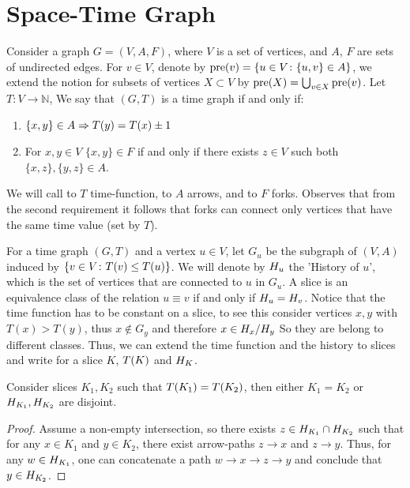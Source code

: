 

  \section{Space-Time Graph}
    


  \begin{definition}
    Consider a graph $G = (V, A, F)$, where $V$ is a set of vertices, and $A$, $F$ are sets of undirected edges. For $v \in V$, denote by $\text{pre}(v) = \{ u \in V \colon \{u,v\} \in A \}$, we extend the notion for subsets of vertices $X \subset V$ by $\text{pre}(X) = \bigcup_{v \in X} \text{pre}(v)$. Let $ T \colon V \rightarrow \mathbb{N}$, We say that $(G,T)$ is a time graph if and only if:
\begin{enumerate}
  \item $\{x,y\} \in A \Rightarrow T(y) = T(x) \pm 1$  
  \item For $x,y \in V $  $\{x,y\} \in F $ if and only if there exists $z \in V $ such both $\{x,z\},\{y,z\} \in A$. 
\end{enumerate} We will call to $T$ time-function, to $A$ arrows, and to $F$ forks. Observes that from the second requirement it follows that forks can connect only vertices that have the same time value (set by $T$). 
  \end{definition}




  \begin{definition}
    For a time graph $(G,T)$ and a vertex $u \in V$, let $G_{u}$ be the subgraph of $(V,A)$ induced by $\{ v \in V \colon T(v) \le T(u) \}$. We will denote by $H_{u}$ the 'History of $u$', which is the set of vertices that are connected to $u$ in $G_{u}$. A slice is an equivalence class of the relation $u \equiv v$ if and only if $H_{u} = H_{v}$. Notice that the time function has to be constant on a slice, to see this consider vertices  $x,y$ with $T(x) > T(y)$, thus $x \notin G_{y}$ and therefore $x \in H_{x}/H_{y}$ So they are belong to different classes. Thus, we can extend the time function and the history to slices and write for a slice $K$, $T(K)$ and $H_{K}$.
  \end{definition}

  \begin{claim} 
    \label{cref:disj}
    Consider slices $K_{1}, K_{2}$ such that $T(K_1) = T(K_2)$, then either $K_{1}=K_{2}$ or $H_{K_1}, H_{K_2}$ are disjoint.
  \end{claim}
  \begin{proof}
Assume a non-empty intersection, so there exists $z \in H_{K_{1}}\cap H_{K_{2}}$ such that for any $x \in K_{1}$ and $y \in K_{2}$, there exist arrow-paths $z \rightarrow x$ and $z \rightarrow y$. Thus, for any $w \in H_{K_{1}}$, one can concatenate a path $w \rightarrow x \rightarrow z \rightarrow y$ and conclude that $y \in H_{K_{2}}$.
  \end{proof}

